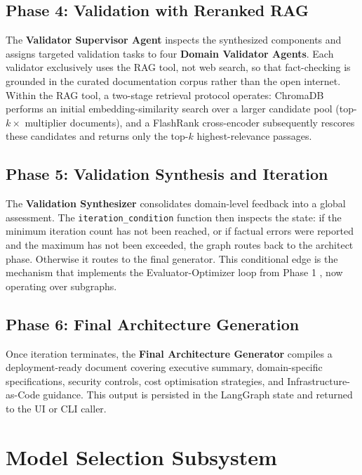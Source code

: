 \subsection{Phase 4: Validation with Reranked RAG}

The \textbf{Validator Supervisor Agent} inspects the synthesized components and assigns targeted validation tasks to four \textbf{Domain Validator Agents}. Each validator exclusively uses the RAG tool, not web search, so that fact-checking is grounded in the curated documentation corpus rather than the open internet. Within the RAG tool, a two-stage retrieval protocol operates: ChromaDB performs an initial embedding-similarity search over a larger candidate pool (top-$k \times$ multiplier documents), and a FlashRank cross-encoder \cite{gao2023retrieval} subsequently rescores these candidates and returns only the top-$k$ highest-relevance passages.

\subsection{Phase 5: Validation Synthesis and Iteration}

The \textbf{Validation Synthesizer} consolidates domain-level feedback into a global assessment. The \texttt{iteration\_condition} function then inspects the state: if the minimum iteration count has not been reached, or if factual errors were reported and the maximum has not been exceeded, the graph routes back to the architect phase. Otherwise it routes to the final generator. This conditional edge is the mechanism that implements the Evaluator-Optimizer loop from Phase 1 \cite{anthropic2024agents}, now operating over subgraphs.

\subsection{Phase 6: Final Architecture Generation}

Once iteration terminates, the \textbf{Final Architecture Generator} compiles a deployment-ready document covering executive summary, domain-specific specifications, security controls, cost optimisation strategies, and Infrastructure-as-Code guidance. This output is persisted in the LangGraph state and returned to the UI or CLI caller.

\section{Model Selection Subsystem}

